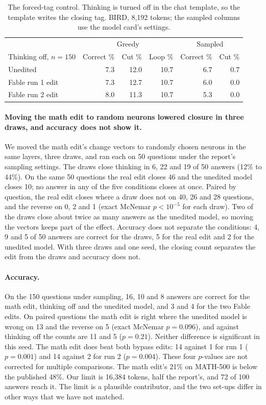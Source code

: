 \documentclass[11pt]{article}
\begin{document}
\begin{table}[h]\centering\small
\begin{tabular}{lrrrrr}
\toprule
 & \multicolumn{3}{c}{Greedy} & \multicolumn{2}{c}{Sampled} \\
Thinking off, $n{=}150$ & Correct \% & Cut \% & Loop \% & Correct \% & Cut \% \\
\midrule
Unedited & 7.3 & 12.0 & 10.7 & 6.7 & 0.7 \\
Fable run 1 edit & 7.3 & 12.7 & 10.7 & 6.0 & 0.0 \\
Fable run 2 edit & 8.0 & 11.3 & 10.7 & 5.3 & 0.0 \\
\bottomrule
\end{tabular}
\caption{The forced-tag control. Thinking is turned off in the chat template, so the template writes the closing tag. BIRD, 8,192 tokens; the sampled columns use the model card's settings.}
\label{tab:flag}
\end{table}

\paragraph{Moving the math edit to random neurons lowered closure in three draws, and accuracy does not show it.} We moved the math edit's change vectors to randomly chosen neurons in the same layers, three draws, and ran each on 50 questions under the report's sampling settings. The draws close thinking in 6, 22 and 19 of 50 answers (12\% to 44\%). On the same 50 questions the real edit closes 46 and the unedited model closes 10; no answer in any of the five conditions closes at once. Paired by question, the real edit closes where a draw does not on 40, 26 and 28 questions, and the reverse on 0, 2 and 1 (exact McNemar $p < 10^{-5}$ for each draw). Two of the draws close about twice as many answers as the unedited model, so moving the vectors keeps part of the effect. Accuracy does not separate the conditions: 4, 9 and 5 of 50 answers are correct for the draws, 5 for the real edit and 2 for the unedited model. With three draws and one seed, the closing count separates the edit from the draws and accuracy does not.

\paragraph{Accuracy.} On the 150 questions under sampling, 16, 10 and 8 answers are correct for the math edit, thinking off and the unedited model, and 3 and 4 for the two Fable edits. On paired questions the math edit is right where the unedited model is wrong on 13 and the reverse on 5 (exact McNemar $p = 0.096$), and against thinking off the counts are 11 and 5 ($p = 0.21$). Neither difference is significant in this seed. The math edit does beat both bypass edits: 14 against 1 for run 1 ($p = 0.001$) and 14 against 2 for run 2 ($p = 0.004$). These four $p$-values are not corrected for multiple comparisons. The math edit's 21\% on MATH-500 is below the published 48\%. Our limit is 16,384 tokens, half the report's, and 72 of 100 answers reach it. The limit is a plausible contributor, and the two set-ups differ in other ways that we have not matched.
\end{document}
